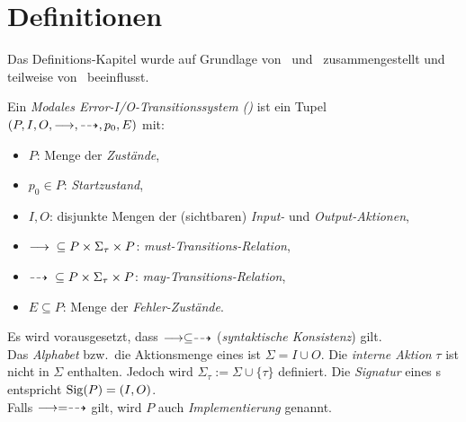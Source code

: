 \section{Definitionen}

Das Definitions-Kapitel wurde auf Grundlage von~\cite{Vogler2015FailSem}
und~\cite{Schinko2016BA} zusammengestellt und teilweise
von~\cite{Vogler2016MIA3} beeinflusst.

\begin{Def}
  Ein \emph{Modales Error-I/O-Transitionssystem (\MEIO{})} ist ein Tupel
  $(P,I,O,\must,\may,p_0,E)$ mit:
  \begin{itemize}
    \item $P$: Menge der \emph{Zustände},
    \item $p_0\in P$: \emph{Startzustand},
    \item $I,O$: disjunkte Mengen der (sichtbaren) \emph{Input-} und
      \emph{Output-Aktionen},
    \item $\must{} \subseteq P\times \Sigma_{\tau}\times P$:
      \emph{must-Transitions-Relation},
    \item $\may{} \subseteq P\times \Sigma_{\tau}\times P$:
      \emph{may-Transitions-Relation},
    \item $E\subseteq P$: Menge der \emph{Fehler-Zustände}.
  \end{itemize}
  Es wird vorausgesetzt, dass $\must\subseteq\may$ (\emph{syntaktische
  Konsistenz}) gilt.\\
  Das \emph{Alphabet} bzw.\ die Aktionsmenge eines \MEIO{} ist $\Sigma = I\cup
  O$. Die \emph{interne Aktion} $\tau$ ist nicht in $\Sigma$ enthalten. Jedoch
  wird $\Sigma_{\tau} := \Sigma \cup \{\tau\}$ definiert. Die \emph{Signatur}
  eines \MEIO{}s entspricht $\mathrm{Sig} (P)=(I,O)$.\\
  Falls $\must =\may$ gilt, wird $P$ auch \emph{Implementierung} genannt.
\end{Def}

